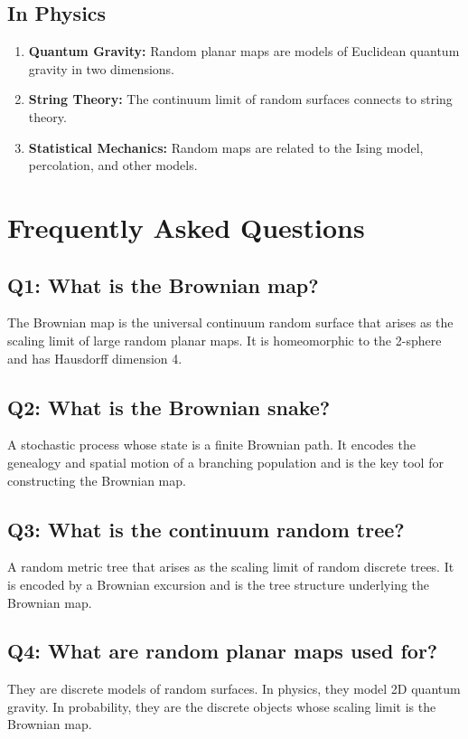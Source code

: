\subsection{In Physics}

\begin{enumerate}
    \item \textbf{Quantum Gravity:} Random planar maps are models of Euclidean quantum gravity in two dimensions.
    \item \textbf{String Theory:} The continuum limit of random surfaces connects to string theory.
    \item \textbf{Statistical Mechanics:} Random maps are related to the Ising model, percolation, and other models.
\end{enumerate}

\section{Frequently Asked Questions}

\subsection*{Q1: What is the Brownian map?}
The Brownian map is the universal continuum random surface that arises as the scaling limit of large random planar maps. It is homeomorphic to the 2-sphere and has Hausdorff dimension 4.

\subsection*{Q2: What is the Brownian snake?}
A stochastic process whose state is a finite Brownian path. It encodes the genealogy and spatial motion of a branching population and is the key tool for constructing the Brownian map.

\subsection*{Q3: What is the continuum random tree?}
A random metric tree that arises as the scaling limit of random discrete trees. It is encoded by a Brownian excursion and is the tree structure underlying the Brownian map.

\subsection*{Q4: What are random planar maps used for?}
They are discrete models of random surfaces. In physics, they model 2D quantum gravity. In probability, they are the discrete objects whose scaling limit is the Brownian map.

